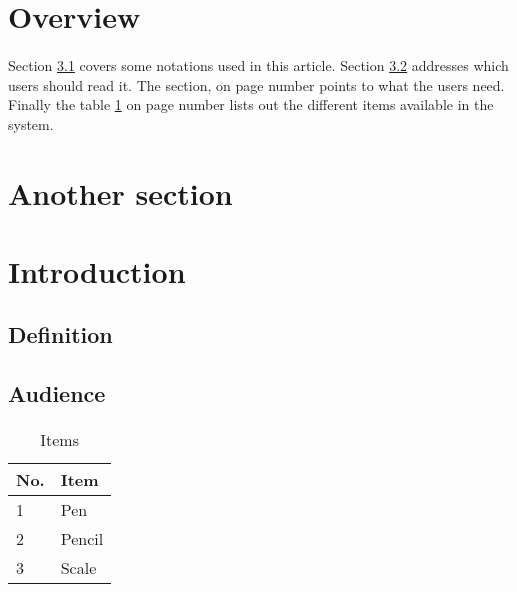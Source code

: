 \documentclass{article}
\begin{document}
    \section{Overview}
    \paragraph{}
    Section \ref{subsec:def} covers some notations used in this article. Section \ref{subsec:audience} addresses which users should read it. The section,  on page number \pageref{subsec:requirement} points to what the users need. Finally the table \ref{tbl:items} on page number \pageref{tbl:items} lists out the different items available in the system.

	\section{Another section}
	\lipsum[1-4]

    \section{Introduction}
    \label{sec:intro}
    \paragraph{}
    \lipsum[1-2]

    \subsection{Definition}
    \label{subsec:def}
    \paragraph{}
    \lipsum[1-2]

    \subsection{Audience}
    \label{subsec:audience}
    \paragraph{}
    \lipsum[1-2]
    \begin{table}[h]
        \centering
        \begin{tabular}{ll}
            \hline
            No. & Item \\
            \hline
            1 & Pen \\
            2 & Pencil \\
            3 & Scale \\
            \hline
        \end{tabular}
        \caption{Items}
        \label{tbl:items}
    \end{table}
\end{document}
